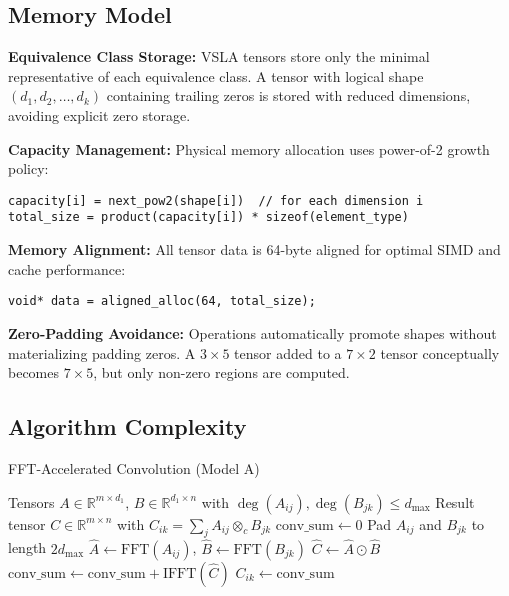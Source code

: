 \documentclass[11pt]{article}
\begin{document}
\subsection{Memory Model}
\label{sec:memory}

\begin{tcolorbox}[colback=memory,colframe=red!50!black,title=Memory Layout and Optimization]
\textbf{Equivalence Class Storage:} VSLA tensors store only the minimal representative of each equivalence class. A tensor with logical shape $(d_1, d_2, \ldots, d_k)$ containing trailing zeros is stored with reduced dimensions, avoiding explicit zero storage.

\textbf{Capacity Management:} Physical memory allocation uses power-of-2 growth policy:
\begin{verbatim}
capacity[i] = next_pow2(shape[i])  // for each dimension i
total_size = product(capacity[i]) * sizeof(element_type)  
\end{verbatim}

\textbf{Memory Alignment:} All tensor data is 64-byte aligned for optimal SIMD and cache performance:
\begin{verbatim}
void* data = aligned_alloc(64, total_size);
\end{verbatim}

\textbf{Zero-Padding Avoidance:} Operations automatically promote shapes without materializing padding zeros. A $3 \times 5$ tensor added to a $7 \times 2$ tensor conceptually becomes $7 \times 5$, but only non-zero regions are computed.
\end{tcolorbox}

\subsection{Algorithm Complexity}

\begin{algorithm}
\caption{FFT-Accelerated Convolution (Model A)}
\begin{algorithmic}[1]
\REQUIRE Tensors $A \in \mathbb{R}^{m \times d_1}$, $B \in \mathbb{R}^{d_1 \times n}$ with $\deg(A_{ij}), \deg(B_{jk}) \leq d_{\max}$
\ENSURE Result tensor $C \in \mathbb{R}^{m \times n}$ with $C_{ik} = \sum_j A_{ij} \otimes_c B_{jk}$
        \STATE $\text{conv\_sum} \leftarrow 0$
            \STATE Pad $A_{ij}$ and $B_{jk}$ to length $2d_{\max}$
            \STATE $\hat{A} \leftarrow \text{FFT}(A_{ij})$, $\hat{B} \leftarrow \text{FFT}(B_{jk})$ 
            \STATE $\hat{C} \leftarrow \hat{A} \odot \hat{B}$ 
            \STATE $\text{conv\_sum} \leftarrow \text{conv\_sum} + \text{IFFT}(\hat{C})$
        \ENDFOR
        \STATE $C_{ik} \leftarrow \text{conv\_sum}$
    \ENDFOR
\ENDFOR
\end{algorithmic}
\end{algorithm}
\end{document}
